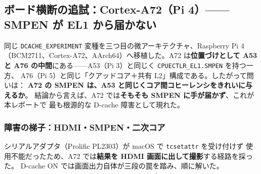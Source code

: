\subsection{ボード横断の追試：Cortex-A72（Pi 4）——SMPEN が EL1 から届かない}
\label{sec:dcache-a72}

同じ \texttt{DCACHE\_EXPERIMENT} 変種を三つ目の微アーキテクチャ、Raspberry Pi 4
（BCM2711、Cortex-A72、AArch64）へ移植した。A72 は\textbf{位置づけとして A53 と
A76 の中間}にある——A53（Pi 3）と同じく \texttt{CPUECTLR\_EL1.SMPEN} を持つ一方、
A76（Pi 5）と同じ「クアッドコア＋共有 L2」構成である。したがって問いは：
\textbf{A72 の SMPEN は、A53 と同じくコア間コヒーレンシをきれいに与えるか}。
結論から言えば、A72 では\textbf{そもそも SMPEN に手が届かず}、これが本レポートで
最も根源的な D-cache 障害として現れた。

\subsubsection*{障害の梯子：HDMI・SMPEN・二次コア}

シリアルアダプタ（Prolific PL2303）が macOS で \texttt{tcsetattr} を受け付けず
使用不能だったため、A72 では\textbf{結果を HDMI 画面に出して撮影}する経路を採った。
D-cache ON では画面出力自体が三段の罠を踏み、順に解いた。

